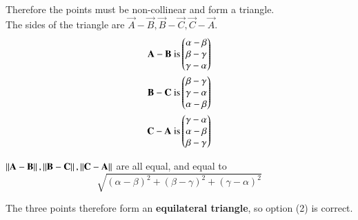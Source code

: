 \documentclass[12pt]{article}
\begin{document}
Therefore the points must be non-collinear and form a triangle.\\

The sides of the triangle are $\vec{A} - \vec{B}, \vec{B} - \vec{C}, \vec{C}- \vec{A}$.\\

\begin{align}
\mathbf{A-B} \text{ is} \begin{pmatrix}\alpha - \beta \\ \beta - \gamma \\ \gamma - \alpha\end{pmatrix} \\
\mathbf{B-C} \text{ is} \begin{pmatrix}\beta - \gamma \\ \gamma - \alpha \\ \alpha - \beta\end{pmatrix} \\
\mathbf{C-A} \text{ is} \begin{pmatrix}\gamma - \alpha \\ \alpha - \beta \\ \beta - \gamma\end{pmatrix}
\end{align}


$\left\lVert\mathbf{A}-\mathbf{B}\right\rVert, \left\lVert\mathbf{B}-\mathbf{C}\right\rVert, \left\lVert\mathbf{C}-\mathbf{A}\right\rVert$ are all equal, and equal to
$$\sqrt{(\alpha - \beta)^2  + (\beta - \gamma)^2 + (\gamma - \alpha)^2}$$

The three points therefore form an \textbf{equilateral triangle}, so option (2) is correct.
\end{document}
